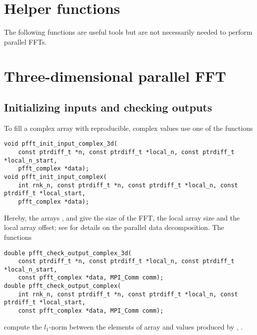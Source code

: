 \section{Helper functions}
The following functions are useful tools but are not necessarily needed to perform parallel FFTs.

\section{Three-dimensional parallel FFT}
\subsection{Initializing inputs and checking outputs}\label{sec:init-data-3d}
To fill a complex array  with reproducible, complex values use one of the functions
\begin{lstlisting}
void pfft_init_input_complex_3d(
    const ptrdiff_t *n, const ptrdiff_t *local_n, const ptrdiff_t *local_n_start,
    pfft_complex *data);
void pfft_init_input_complex(
    int rnk_n, const ptrdiff_t *n, const ptrdiff_t *local_n, const ptrdiff_t *local_start,
    pfft_complex *data);
\end{lstlisting}
Hereby, the arrays ,  and  give the size of the FFT, the local array size and the local array offset;
see \cite{sec:par-data-decomp} for details on the parallel data decomposition.
The functions
\begin{lstlisting}
double pfft_check_output_complex_3d(
    const ptrdiff_t *n, const ptrdiff_t *local_n, const ptrdiff_t *local_n_start,
    const pfft_complex *data, MPI_Comm comm);
double pfft_check_output_complex(
    int rnk_n, const ptrdiff_t *n, const ptrdiff_t *local_n, const ptrdiff_t *local_start,
    const pfft_complex *data, MPI_Comm comm);
\end{lstlisting}
compute the $l_1$-norm between the elements of array  and values produced by , .

